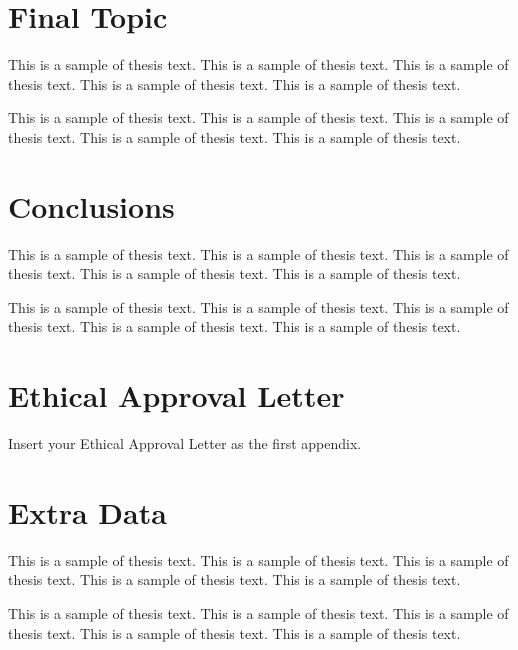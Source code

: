 \documentclass[12pt,oneside]{book} %
\begin{document}
\chapter{Final Topic}
This is a sample of thesis text. This is a sample of thesis text. This is a 
sample of thesis text. This is a sample of thesis text. This is a sample of
thesis text.

This is a sample of thesis text. This is a sample of thesis text. This is a 
sample of thesis text. This is a sample of thesis text. This is a sample of
thesis text.


\chapter{Conclusions}
This is a sample of thesis text. This is a sample of thesis text. This is a 
sample of thesis text. This is a sample of thesis text. This is a sample of
thesis text.

This is a sample of thesis text. This is a sample of thesis text. This is a 
sample of thesis text. This is a sample of thesis text. This is a sample of
thesis text.


%





\appendix
\chapter{Ethical Approval Letter}
Insert your Ethical Approval Letter as the first appendix.

\chapter{Extra Data}
This is a sample of thesis text. This is a sample of thesis text. This is a 
sample of thesis text. This is a sample of thesis text. This is a sample of
thesis text.

This is a sample of thesis text. This is a sample of thesis text. This is a 
sample of thesis text. This is a sample of thesis text. This is a sample of
thesis text.
\end{document}
